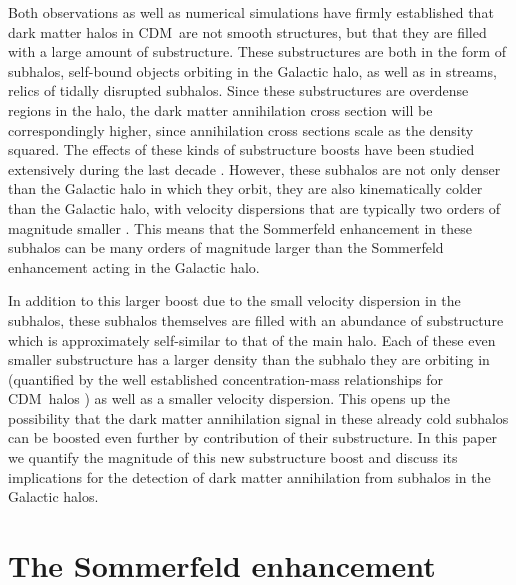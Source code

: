 \documentclass[aps,prd,twocolumn,amsmath,amssymb,floatfix,nofootinbib,10pt]{revtex4}
\newcommand{\CDM}{CDM}
\begin{document}
Both observations
\cite{1994Natur.370..194I,1999Natur.402...53H,2005ApJ...626L..85W,2007ApJ...654..897B,koposov}
as well as numerical simulations
\cite{1998MNRAS.300..146G,johnston98a,1999ApJ...524L..19M,1999ApJ...522...82K,1999MNRAS.307..495H,2003MNRAS.339..834H,2008Natur.454..735D,2008MNRAS.391.1685S}
have firmly established that dark matter halos in \CDM\ are not smooth
structures, but that they are filled with a large amount of
substructure. These substructures are both in the form of subhalos,
self-bound objects orbiting in the Galactic halo, as well as in
streams, relics of tidally disrupted subhalos. Since these
substructures are overdense regions in the halo, the dark matter
annihilation cross section will be correspondingly higher, since
annihilation cross sections scale as the density squared. The effects
of these kinds of substructure boosts have been studied extensively
during the last decade
\cite{2004PhRvD..70b3512B,2004PhRvD..69d3501K,2007ApJ...657..262D,2007PhRvD..75h3526S,2008A&A...479..427L,2008MNRAS.384.1627P,2008ApJ...678..614S,2008ApJ...686..262K,2008Natur.456...73S,2008arXiv0809.2781G}. However,
these subhalos are not only denser than the Galactic halo in which
they orbit, they are also kinematically colder than the Galactic halo,
with velocity dispersions that are typically two orders of magnitude
smaller \cite{1998ARA&A..36..435M,2007ApJ...670..313S}. This means
that the Sommerfeld enhancement in these subhalos can be many orders
of magnitude larger than the Sommerfeld enhancement acting in the
Galactic halo.

In addition to this larger boost due to the small
velocity dispersion in the subhalos, these subhalos themselves are
filled with an abundance of substructure which is approximately
self-similar to that of the main halo. Each of these even smaller
substructure has a larger density than the subhalo they are orbiting
in (quantified by the well established concentration-mass
relationships for \CDM\ halos
\cite{2001MNRAS.321..559B,2001ApJ...554..114E}) as well as a smaller
velocity dispersion. This opens up the possibility that the dark
matter annihilation signal in these already cold subhalos can be
boosted even further by contribution of their substructure. In this
paper we quantify the magnitude of this new substructure boost and
discuss its implications for the detection of dark matter annihilation
from subhalos in the Galactic halos.




\section{The Sommerfeld enhancement}
\end{document}
